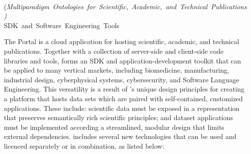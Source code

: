 \documentclass[11pt,letterpaper]{article}
\begin{document}
\vspace*{-6em}

\begin{center}
{}\\
\vspace{8pt}
\mbox{(\textit{Multiparadigm Ontologies for 
Scientific, Academic, and Technical Publications)}}\\\vspace{2pt}
\mbox{{\Large SDK and Software Engineering Tools}}\\\vspace{8pt}
\end{center}

\vspace*{-1em}

The {\MOSAIC} Portal is a cloud application for hosting 
scientific, academic, and 
technical publications.  Together with a collection 
of server-side and client-side code libraries and tools, 
{\MOSAIC} forms an SDK and application-development 
toolkit that can be applied to many vertical markets, 
including biomedicine, manufacturing, industrial design, 
cyberphysical systems, cybersecurity, and Software 
Language Engineering.  This versatility is a result 
of {\MOSAIC}'s unique design principles for creating a 
platform that hosts data sets which are paired with 
self-contained, customized applications.  These include: 
scientific data must be exposed in a representation that 
preserves semantically rich scientific principles; and 
dataset applications must be implemented according a 
streamlined, modular design that limits external dependencies.
\vspace{-1.8em}
\EnglischeLinie
\vspace*{-.2em}
{\lfMOSAIC} includes several new technologies that can 
be used and licenced separately or in combination, as listed below: 
\end{document}
